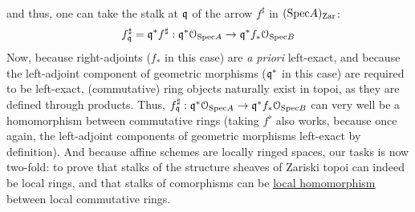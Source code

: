 \begin{remark}
\begin{enumerate}
$$\begin{tikzcd}
                                    \end{tikzcd}
                                $$
                            and thus, one can take the stalk at $\mathfrak{q}$ of the arrow $f^{\sharp}$ in $(\mathrm{Spec} A)_{\mathrm{Zar}}$:
                                $$f^{\sharp}_{\mathfrak{q}} = \mathfrak{q}^* f^{\sharp}: \mathfrak{q}^*\mathcal{O}_{\mathrm{Spec} A} \to \mathfrak{q}^*f_*\mathcal{O}_{\mathrm{Spec} B}$$ 
                            Now, because right-adjoints ($f_*$ in this case) are \textit{a priori} left-exact, and because the left-adjoint component of geometric morphisms ($\mathfrak{q}^*$ in this case) are required to be left-exact, (commutative) ring objects naturally exist in topoi, as they are defined through products. Thus, $f^{\sharp}_{\mathfrak{q}}: \mathfrak{q}^*\mathcal{O}_{\mathrm{Spec} A} \to \mathfrak{q}^*f_*\mathcal{O}_{\mathrm{Spec} B}$ can very well be a homomorphism between commutative rings (taking $f^{\flat}$ also works, because once again, the left-adjoint components of geometric morphisms left-exact by definition). And because affine schemes are locally ringed spaces, our tasks is now two-fold: to prove that stalks of the structure sheaves of Zariski topoi can indeed be local rings, and that stalks of comorphisms can be \href{https://proofwiki.org/wiki/Definition:Local_Ring_Homomorphism}{\underline{local homomorphism}} between local commutative rings. 
                            

\end{enumerate}
\end{remark}
